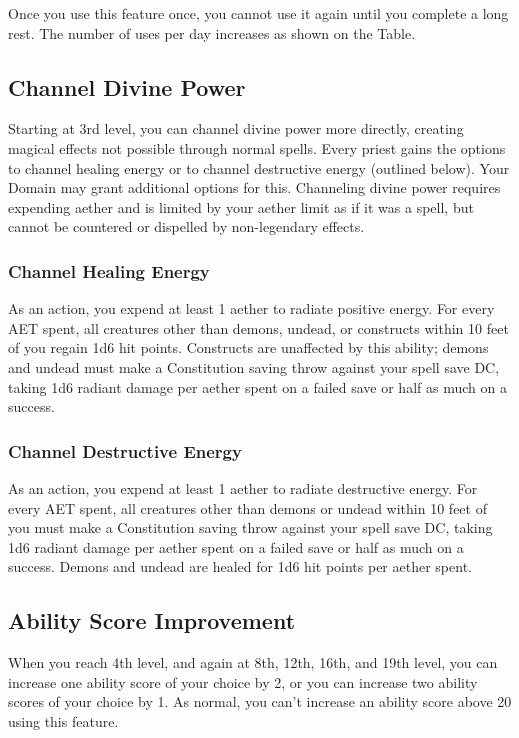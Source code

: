 Once you use this feature once, you cannot use it again until you complete a long rest. The number of uses per day increases as shown on the  Table.

\subsection{Channel Divine Power}
Starting at 3rd level, you can channel divine power more directly, creating magical effects not possible through normal spells. Every priest gains the options to channel healing energy or to channel destructive energy (outlined below). Your Domain may grant additional options for this. Channeling divine power requires expending aether and is limited by your aether limit as if it was a spell, but cannot be countered or dispelled by non-legendary effects.

\subsubsection{Channel Healing Energy}
As an action, you expend at least 1 aether to radiate positive energy. For every AET spent, all creatures other than demons, undead, or constructs within 10 feet of you regain 1d6 hit points. Constructs are unaffected by this ability; demons and undead must make a Constitution saving throw against your spell save DC, taking 1d6 radiant damage per aether spent on a failed save or half as much on a success.

\subsubsection{Channel Destructive Energy}
As an action, you expend at least 1 aether to radiate destructive energy. For every AET spent, all creatures other than demons or undead within 10 feet of you must make a Constitution saving throw against your spell save DC, taking 1d6 radiant damage per aether spent on a failed save or half as much on a success. Demons and undead are healed for 1d6 hit points per aether spent.

\subsection{Ability Score Improvement}

When you reach 4th level, and again at 8th, 12th, 16th, and 19th level, you can increase one ability score of your choice by 2, or you can increase two ability scores of your choice by 1. As normal, you can't increase an ability score above 20 using this feature.

